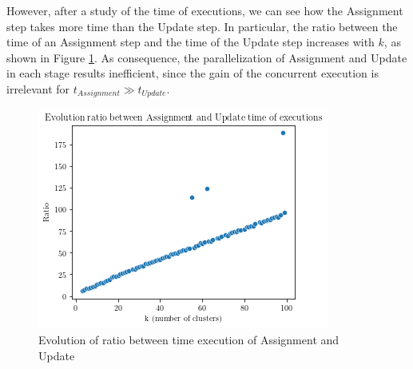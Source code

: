 However, after a study of the time of executions, we can see how the Assignment step takes more time than the Update step. In particular, the ratio between the time of an Assignment step and the time of the Update step increases with $k$, as shown in Figure \ref{fig:ratio_k}. As consequence, the parallelization of Assignment and Update in each stage results inefficient, since the gain of the concurrent execution is irrelevant for $t_{Assignment} \gg t_{Update}$.

\begin{figure}[ht]
\centering
\includegraphics[width=\linewidth]{./plots/ratio_k.png}
\caption{Evolution of ratio between time execution of Assignment and Update}
\label{fig:ratio_k}
\end{figure}

